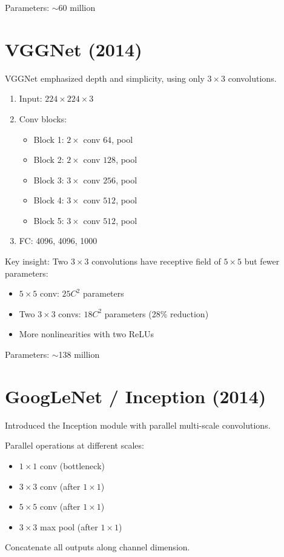 Parameters: $\sim$60 million

\section{VGGNet (2014)}

VGGNet emphasized depth and simplicity, using only $3\times3$ convolutions.

\begin{architecture}
\begin{enumerate}
    \item Input: $224\times224\times3$
    \item Conv blocks:
    \begin{itemize}
        \item Block 1: $2\times$ conv $64$, pool
        \item Block 2: $2\times$ conv $128$, pool
        \item Block 3: $3\times$ conv $256$, pool
        \item Block 4: $3\times$ conv $512$, pool
        \item Block 5: $3\times$ conv $512$, pool
    \end{itemize}
    \item FC: 4096, 4096, 1000
\end{enumerate}
\end{architecture}

Key insight: Two $3\times3$ convolutions have receptive field of $5\times5$ but fewer parameters:
\begin{itemize}
    \item $5\times5$ conv: $25C^2$ parameters
    \item Two $3\times3$ convs: $18C^2$ parameters (28\% reduction)
    \item More nonlinearities with two ReLUs
\end{itemize}

Parameters: $\sim$138 million

\section{GoogLeNet / Inception (2014)}

Introduced the Inception module with parallel multi-scale convolutions.

\begin{architecture}
Parallel operations at different scales:
\begin{itemize}
    \item $1\times1$ conv (bottleneck)
    \item $3\times3$ conv (after $1\times1$)
    \item $5\times5$ conv (after $1\times1$)
    \item $3\times3$ max pool (after $1\times1$)
\end{itemize}
Concatenate all outputs along channel dimension.
\end{architecture}

